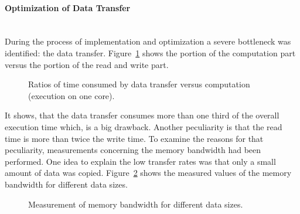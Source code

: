\documentclass[american, hauptseminar, twoside]{zihpub}
\begin{document}
				\paragraph{Optimization of Data Transfer}\mbox{}\\
						During the process of implementation and optimization a severe bottleneck was identified: the data transfer. Figure~\ref{fig:circle} shows the portion of the computation part versus the portion of the read and write part.
						\begin{figure}[h]
							\centering
							\caption{Ratios of time consumed by data transfer versus computation (execution on one core).}
							\label{fig:circle}
						\end{figure}				
						It shows, that the data transfer consumes more than one third of the overall execution time which, is a big drawback. Another peculiarity is that the read time is more than twice the write time. To examine the reasons for that peculiarity, measurements concerning the memory bandwidth had been performed. One idea to explain the low transfer rates was that only a small amount of data was copied. Figure~\ref{fig:bandwidth} shows the measured values of the memory bandwidth for different data sizes.
						\begin{figure}[h]
							\centering
							\caption{Measurement of memory bandwidth for different data sizes.}
							\label{fig:bandwidth}
						\end{figure}
\end{document}
